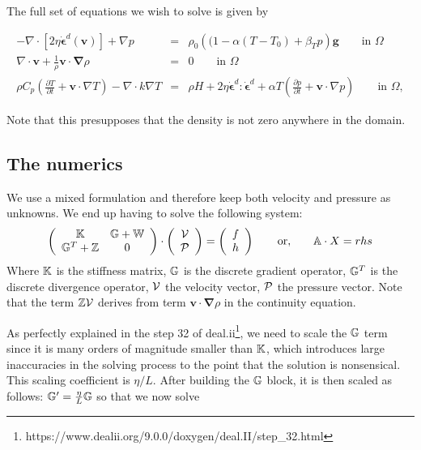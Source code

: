 The full set of equations we wish to solve is given by

\begin{eqnarray}
-\nabla \cdot \left[2\eta \dot{\bm \epsilon}^d({\bm v}) \right] + \nabla p &=& \rho_0 \left((1 - \alpha(T-T_0) + \beta_T p \right) {\bm g} \quad\quad \textrm{in $\Omega$}  \label{eq:stokes-1a_} \\
\nabla \cdot {\bm v} + \frac{1}{\rho} {\bm v} \cdot {\bm \nabla}\rho&=&0 \quad\quad  \textrm{in $\Omega$}   \label{eq:stokes-2a_} \\
\rho C_p \left(\frac{\partial T}{\partial t} + \bm v\cdot\nabla T\right) - \nabla\cdot k\nabla T   &=& 
  \rho H  +  2\eta \dot{\bm \epsilon}^d : \dot{\bm \epsilon}^d    +\alpha T \left( \frac{\partial p}{\partial t}+  \bm v \cdot \nabla p \right) 
\quad\quad   \textrm{in $\Omega$},
  \label{eq:temperature_}
\end{eqnarray}

Note that this presupposes that the density is not zero anywhere in the domain.


\subsection*{The numerics}

We use a mixed formulation and therefore  
keep both velocity and pressure as unknowns. We end up having to solve 
the following system:
\[
\left(
\begin{array}{cc}
{\mathbb{K}} & {\mathbb{G}}+{\mathbb{W}} \\ {\mathbb{G}}^T+{\mathbb{Z}} & 0 
\end{array}
\right)
\cdot
\left(
\begin{array}{c}
{\cal V} \\ {\cal P}
\end{array}
\right)
=
\left(
\begin{array}{c}
 f \\ h
\end{array}
\right)
\quad\quad
{\rm or,}
\quad\quad
{\mathbb{A}} \cdot X = rhs
\]
Where ${\mathbb{K}}$ is the stiffness matrix, ${\mathbb{G}}$ is the discrete gradient operator, 
${\mathbb{G}}^T$ is the discrete divergence operator, ${\cal V}$ the velocity vector, 
${\cal P}$ the pressure vector.
Note that the term ${\mathbb{Z}}{\cal V}$ derives from term ${\bm v} \cdot {\bm \nabla} \rho$ in the continuity equation. 

As perfectly explained in the step 32 of deal.ii\footnote{https://www.dealii.org/9.0.0/doxygen/deal.II/step\_32.html},
we need to scale the ${\mathbb{G}}$ term since it is many orders of magnitude smaller than ${\mathbb{K}}$, which introduces large inaccuracies in the solving process to the point that the solution is nonsensical. This scaling coefficient is $\eta/L$. After building the ${\mathbb{G}}$ block, it is then scaled as follows: ${\mathbb{G}}'=\frac{\eta}{L}{\mathbb{G}}$ so that we now solve 

